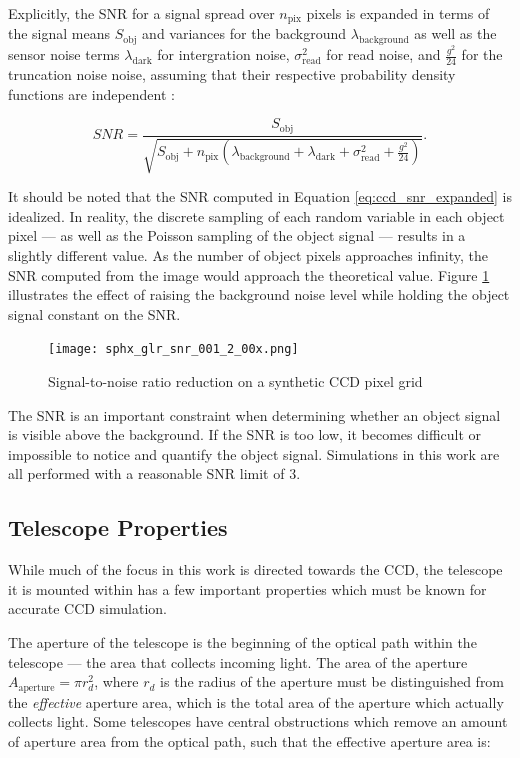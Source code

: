 Explicitly, the SNR for a signal spread over $n_\mathrm{pix}$ pixels is expanded in terms of the signal means $S_\mathrm{obj}$ and variances for the background $\lambda_\mathrm{background}$ as well as the sensor noise terms $\lambda_\mathrm{dark}$ for intergration noise, $\sigma^2_\mathrm{read}$ for read noise, and $\frac{g^2}{24}$ for the truncation noise noise, assuming that their respective probability density functions are independent \cite{frueh2019notes}:

\begin{equation} \label{eq:ccd_snr_expanded}
  SNR = \frac{S_\mathrm{obj}}{\sqrt{S_\mathrm{obj} + n_\mathrm{pix} \left( \lambda_\mathrm{background} + \lambda_\mathrm{dark} + \sigma^2_\mathrm{read} + \frac{g^2}{24} \right)}}.
\end{equation}

It should be noted that the SNR computed in Equation \ref{eq:ccd_snr_expanded} is idealized. In reality, the discrete sampling of each random variable in each object pixel --- as well as the Poisson sampling of the object signal --- results in a slightly different value. As the number of object pixels approaches infinity, the SNR computed from the image would approach the theoretical value. Figure \ref{fig:snr_grid} illustrates the effect of raising the background noise level while holding the object signal constant on the SNR.

\begin{figure}[ht]
  \centering
  \texttt{[image: sphx\_glr\_snr\_001\_2\_00x.png]}
  \caption{Signal-to-noise ratio reduction on a synthetic CCD pixel grid}
  \label{fig:snr_grid}
\end{figure}

The SNR is an important constraint when determining whether an object signal is visible above the background. If the SNR is too low, it becomes difficult or impossible to notice and quantify the object signal. Simulations in this work are all performed with a reasonable SNR limit of $3$.

\subsection{Telescope Properties} \label{sec:telescope_properties}

While much of the focus in this work is directed towards the CCD, the telescope it is mounted within has a few important properties which must be known for accurate CCD simulation. 

The aperture of the telescope is the beginning of the optical path within the telescope --- the area that collects incoming light. The area of the aperture $A_\mathrm{aperture} = \pi r_{d}^2$, where $r_d$ is the radius of the aperture must be distinguished from the \textit{effective} aperture area, which is the total area of the aperture which actually collects light. Some telescopes have central obstructions which remove an amount of aperture area from the optical path, such that the effective aperture area is:

